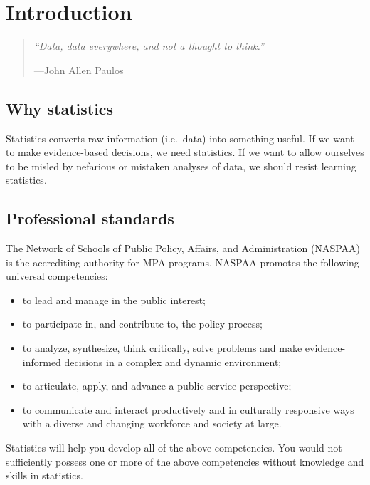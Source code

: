\documentclass[
]{book}
\providecommand{\tightlist}{%
  \setlength{\itemsep}{0pt}\setlength{\parskip}{0pt}}
\begin{document}
\hypertarget{intro}{%
\chapter{Introduction}\label{intro}}

\begin{quote}
\emph{``Data, data everywhere, and not a thought to think.''}

---John Allen Paulos
\end{quote}

\hypertarget{why-statistics}{%
\section{Why statistics}\label{why-statistics}}

Statistics converts raw information (i.e.~data) into something useful. If we want to make evidence-based decisions, we need statistics. If we want to allow ourselves to be misled by nefarious or mistaken analyses of data, we should resist learning statistics.

\hypertarget{professional-standards}{%
\section{Professional standards}\label{professional-standards}}

The Network of Schools of Public Policy, Affairs, and Administration (NASPAA) is the accrediting authority for MPA programs. NASPAA promotes the following universal competencies:

\begin{itemize}
\tightlist
\item
  to lead and manage in the public interest;
\item
  to participate in, and contribute to, the policy process;
\item
  to analyze, synthesize, think critically, solve problems and make evidence-informed decisions in a complex and dynamic environment;
\item
  to articulate, apply, and advance a public service perspective;
\item
  to communicate and interact productively and in culturally responsive ways with a diverse and changing workforce and society at large.
\end{itemize}

Statistics will help you develop all of the above competencies. You would not sufficiently possess one or more of the above competencies without knowledge and skills in statistics.
\end{document}

